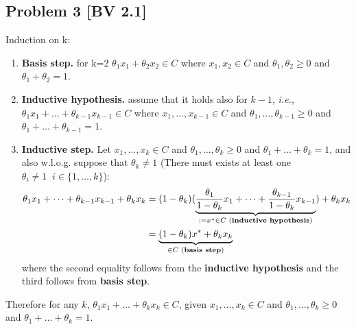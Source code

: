 \documentclass[12pt, letterpaper, twoside]{article}
\begin{document}
\subsection*{Problem 3 \small[BV 2.1]}
Induction on k:
\begin{enumerate}
    \item \textbf{Basis step.} for k=2 $\theta_1x_1+\theta_2x_2\in C$ where $x_1,x_2\in C$ and $\theta_1, \theta_2\geq0$ and $\theta_1+\theta_2=1$.
    \item \textbf{Inductive hypothesis.} assume that it holds also for $k-1$, \emph{i.e.}, $\theta_1x_1+\dots+\theta_{k-1}x_{k-1}\in C$ where $x_1,\dots,x_{k-1}\in C$ and $\theta_1, \dots, \theta_{k-1}\geq0$ and $\theta_1+\dots+\theta_{k-1}=1$.
    \item \textbf{Inductive step.} Let $x_1,\dots,x_{k}\in C$ and $\theta_1, \dots, \theta_{k}\geq0$ and $\theta_1+\dots+\theta_{k}=1$, and also w.l.o.g. suppose that $\theta_k\neq1$ (There must exists at least one $\theta_i\neq1 \;\; i\in\{1,\dots, k\}$):
    \begin{align*}
        \theta_1x_1+\dots+\theta_{k-1}x_{k-1} + \theta_kx_k
        &=(1-\theta_k)(\underbrace{\frac{\theta_1}{1-\theta_k}x_1+\dots+\frac{\theta_{k-1}}{1-\theta_k}x_{k-1}}_{:=x^{*}\in C \text{ (\textbf{inductive hypothesis})}} )+\theta_kx_k\\
        &=\underbrace{(1-\theta_k)x^{*}+\theta_kx_k}_{\in C \text{ (\textbf{basis step})}}
    \end{align*}
    where the second equality follows from the \textbf{inductive hypothesis} and the third follows from \textbf{basis step}.
\end{enumerate}
Therefore for any $k$, $\theta_1x_1+\dots+\theta_kx_k\in C$, given $x_1,\dots,x_{k}\in C$ and $\theta_1, \dots, \theta_{k}\geq0$ and $\theta_1+\dots+\theta_{k}=1$.\\
\clearpage
\end{document}

